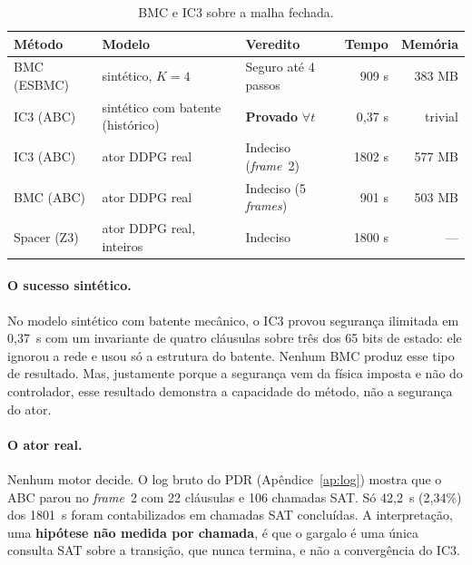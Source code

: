 \documentclass[12pt,openright,oneside,a4paper,chapter=TITLE,sumario=tradicional,english,brazil]{abntex2}
\begin{document}
\begin{table}[htb]
\caption{BMC e IC3 sobre a malha fechada.}\label{tab:bmcic3}
\centering
\begin{tabular}{p{2.0cm}|p{3.2cm}|p{3.3cm}|r|r}
\toprule
\textbf{Método} & \textbf{Modelo} & \textbf{Veredito} & \textbf{Tempo} & \textbf{Memória} \\
\midrule
BMC (ESBMC)  & sintético, $K{=}4$         & Seguro até 4 passos           & 909 s  & 383 MB \\
IC3 (ABC)    & sintético com batente (histórico) & \textbf{Provado} $\forall t$ & 0,37 s & trivial \\
IC3 (ABC)    & ator DDPG real             & Indeciso (\emph{frame}~2)     & 1802 s & 577 MB \\
BMC (ABC)    & ator DDPG real             & Indeciso (5 \emph{frames})    & 901 s  & 503 MB \\
Spacer (Z3)  & ator DDPG real, inteiros   & Indeciso                      & 1800 s & --- \\
\bottomrule
\end{tabular}
\end{table}

\paragraph{O sucesso sintético.} No modelo sintético com batente mecânico, o IC3 provou segurança ilimitada em 0,37~s com um invariante de quatro cláusulas sobre três dos 65 bits de estado: ele ignorou a rede e usou só a estrutura do batente. Nenhum BMC produz esse tipo de resultado. Mas, justamente porque a segurança vem da física imposta e não do controlador, esse resultado demonstra a capacidade do método, não a segurança do ator.

\paragraph{O ator real.} Nenhum motor decide. O log bruto do PDR (Apêndice~\ref{ap:log}) mostra que o ABC parou no \emph{frame}~2 com 22 cláusulas e 106 chamadas SAT. Só 42,2~s (2,34\%) dos 1801~s foram contabilizados em chamadas SAT concluídas. A interpretação, uma \textbf{hipótese não medida por chamada}, é que o gargalo é uma única consulta SAT sobre a transição, que nunca termina, e não a convergência do IC3.
\end{document}

